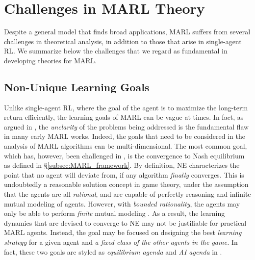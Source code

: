 \section{Challenges in MARL Theory}\label{sec:challenges} 

Despite a general model that finds broad applications,  MARL  suffers  from several challenges in theoretical analysis, in addition to those that  arise in single-agent RL. We summarize below the  challenges that we regard as fundamental in developing theories for MARL.  
 

\subsection{Non-Unique  Learning Goals}\label{subsec:learning_goal}
Unlike single-agent RL, where the goal of the agent is to maximize the long-term return efficiently, the learning goals of MARL can be vague at times. In fact, as argued in \cite{shoham2003multi}, the \emph{unclarity} of the problems being addressed is the  fundamental flaw in many early MARL works. Indeed, the goals that need to be considered in the analysis of MARL algorithms can be multi-dimensional. The most common goal,  which has, however,  been challenged in \cite{shoham2003multi}, is the convergence to Nash equilibrium as defined in \S\ref{subsec:MARL_framework}. By definition, NE characterizes the point that no agent will deviate from, if any algorithm  \emph{finally} converges.  This is undoubtedly a  reasonable solution concept in game theory, under the assumption that the agents are all \emph{rational}, and are capable of perfectly reasoning and infinite mutual
modeling of agents. However, with \emph{bounded rationality}, the agents may only be able to perform \emph{finite} mutual modeling \cite{shoham2008multiagent}. As a result, the learning dynamics that are devised to converge to  NE may not be justifiable for practical MARL  agents. Instead, the goal may be focused on designing the best \emph{learning strategy} for a given agent and \emph{a fixed class of the other agents in the
game.}   In fact, these two goals are styled as \emph{equilibrium agenda} and \emph{AI agenda} in \cite{shoham2003multi}. 


